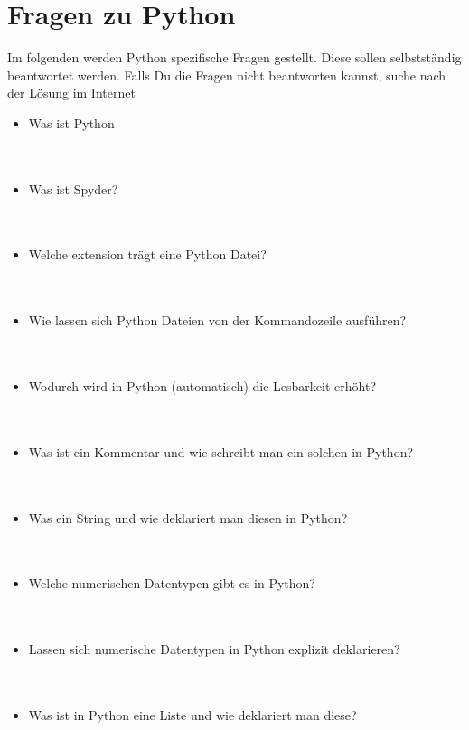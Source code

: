 \section{Fragen zu Python}
Im folgenden werden Python spezifische Fragen gestellt. Diese sollen selbstständig beantwortet werden. Falls Du die Fragen nicht beantworten kannst, suche nach der Lösung im Internet
\begin{itemize}
	\item{Was ist Python}
	\\
	\\
	\\
	\item{Was ist Spyder?}
	\\
	\\
	\\
	\item{Welche extension trägt eine Python Datei?}
	\\
	\\
	\\
	\item{Wie lassen sich Python Dateien von der Kommandozeile ausführen?}
	\\
	\\
	\\
	\item{Wodurch wird in Python (automatisch) die Lesbarkeit erhöht?}
	\\
	\\
	\\
	\item{Was ist ein Kommentar und wie schreibt man ein solchen in Python?}
	\\
	\\
	\\	
	\item{Was ein String und wie deklariert man diesen in Python?}
	\\
	\\
	\\
	\item{Welche numerischen Datentypen gibt es in Python?}
	\\
	\\
	\\
	\item{Lassen sich numerische Datentypen in Python explizit deklarieren?}
	\\
	\\
	\\
	\item{Was ist in Python eine Liste und wie deklariert man diese?}
	\\

\end{itemize}
